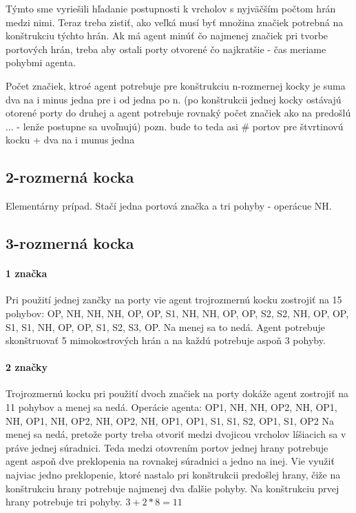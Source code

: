 Týmto sme vyriešili hľadanie postupnosti k vrcholov s nyjväčším počtom hrán
medzi nimi. Teraz treba zistiť, ako veľká musí byť množina značiek potrebná
na konštrukciu týchto hrán.
Ak má agent minúť čo najmenej značiek pri tvorbe portových hrán, treba aby
ostali porty otvorené čo najkratšie - čas meriame pohybmi agenta.

Počet značiek, ktroé agent potrebuje pre konštrukciu n-rozmernej kocky je
suma dva na i minus jedna pre i od jedna po n. (po konštrukcii jednej kocky
ostávajú otorené porty do druhej a agent potrebuje rovnaký počet značiek ako
na predošlú ... - lenže postupne sa uvoľnujú) pozn. bude to teda asi \#
portov pre štvrtinovú kocku + dva na i munus jedna

\subsection{2-rozmerná kocka}
Elementárny prípad. Stačí jedna portová značka a tri pohyby - operácue NH.
\subsection{3-rozmerná kocka}
\paragraph{1 značka}
Pri použití jednej zančky na porty vie agent trojrozmernú kocku zostrojiť na 15 pohybov:
OP, NH, NH, NH, OP, OP, S1, NH, NH, OP, OP, S2, S2, NH, OP, OP, S1, S1, NH, OP, OP, S1, S2, S3, OP. Na
menej sa to nedá. Agent potrebuje skonštruovať 5 mimokostrových hrán a na
každú potrebuje aspoň 3 pohyby.

\paragraph{2 značky}
Trojrozmernú kocku pri použití dvoch značiek na porty dokáže agent zostrojiť
na 11 pohybov a menej sa nedá. Operácie agenta:
OP1, NH, NH, OP2, NH, OP1, NH, OP1, NH, OP2, NH, OP2, NH, OP1, OP1, S1, S1, S2, OP1, S1, OP2
Na menej sa nedá, pretože porty treba otvoriť medzi dvojicou vrcholov
líšiacich sa v práve jednej súradnici. Teda medzi otovrením portov jednej
hrany potrebuje agent aspoň dve preklopenia na rovnakej súradnici a jedno na
inej. Vie využiť najviac jedno preklopenie, ktoré nastalo pri konštrukcii
predošlej hrany, čiže na konštrukciu hrany potrebuje najmenej dva ďalšie
pohyby. Na konštrukciu prvej hrany potrebuje tri pohyby. $3 + 2 * 8 = 11$

